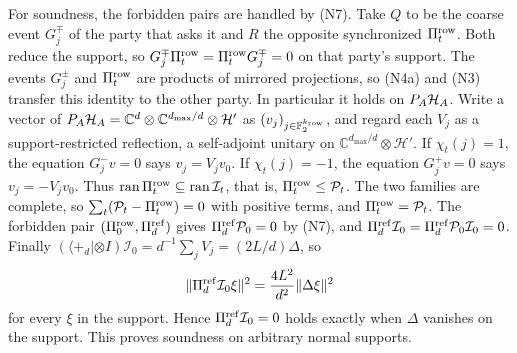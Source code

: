 For soundness, the forbidden pairs are handled by (N7). Take $Q$ to be the coarse event $G^\mp_j$ of the party that asks it and $R$ the opposite synchronized $\Pi^{\rm row}_t$. Both reduce the support, so $G^\mp_j\Pi^{\rm row}_t=\Pi^{\rm row}_tG^\mp_j=0$ on that party's support. The events $G^\pm_j$ and $\Pi^{\rm row}_t$ are products of mirrored projections, so (N4a) and (N3) transfer this identity to the other party. In particular it holds on $P_A\mathcal H_A$. Write a vector of $P_A\mathcal H_A=\mathbb C^d\otimes\mathbb C^{d_{\max}/d}\otimes\mathcal H'$ as $(v_j)_{j\in\mathbb F_2^{k_{\rm row}}}$, and regard each $V_j$ as a support-restricted reflection, a self-adjoint unitary on $\mathbb C^{d_{\max}/d}\otimes\mathcal H'$. If $\chi_t(j)=1$, the equation $G^-_jv=0$ says $v_j=V_jv_0$. If $\chi_t(j)=-1$, the equation $G^+_jv=0$ says $v_j=-V_jv_0$. Thus $\operatorname{ran}\Pi^{\rm row}_t\subseteq\operatorname{ran}\mathcal I_t$, that is, $\Pi^{\rm row}_t\leq\mathcal P_t$. The two families are complete, so $\sum_t(\mathcal P_t-\Pi^{\rm row}_t)=0$ with positive terms, and $\Pi^{\rm row}_t=\mathcal P_t$. The forbidden pair $(\Pi^{\rm row}_0,\Pi^{\rm ref}_d)$ gives $\Pi^{\rm ref}_d\mathcal P_0=0$ by (N7), and $\Pi^{\rm ref}_d\mathcal I_0=\Pi^{\rm ref}_d\mathcal P_0\mathcal I_0=0$. Finally $(\langle+_d|\otimes I)\mathcal I_0=d^{-1}\sum_jV_j=(2L/d)\Delta$, so
\[
 \|\Pi^{\rm ref}_d\mathcal I_0\xi\|^2=\frac{4L^2}{d^2}\|\Delta\xi\|^2
\]
for every $\xi$ in the support. Hence $\Pi^{\rm ref}_d\mathcal I_0=0$ holds exactly when $\Delta$ vanishes on the support. This proves soundness on arbitrary normal supports.

